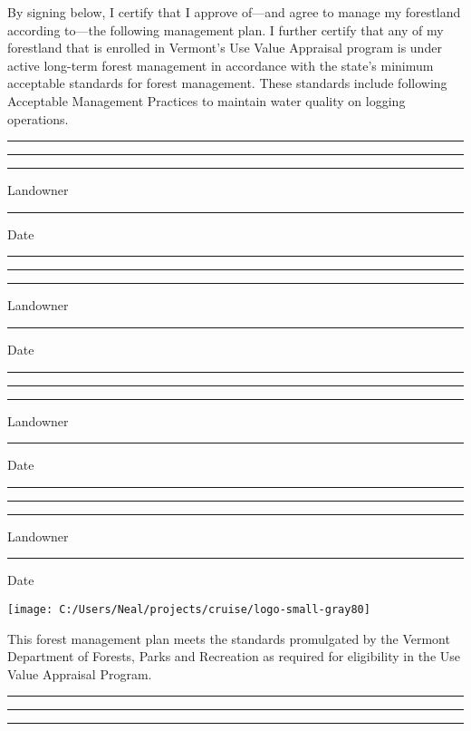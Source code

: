 \documentclass[]{tufte-handout}
\begin{document}
\vspace{20pt} By signing below, I certify that I approve of---and agree
to manage my forestland according to---the following management plan. I
further certify that any of my forestland that is enrolled in Vermont's
Use Value Appraisal program is under active long-term forest management
in accordance with the state's minimum acceptable standards for forest
management. These standards include following Acceptable Management
Practices to maintain water quality on logging operations.

\vspace{22pt}

\noindent\rule{7.3cm}{0.4pt} \rule{.3cm}{0pt} \rule{3cm}{0.4pt}

\noindent Landowner \rule{6cm}{0pt} Date

\vspace{18pt}

\noindent\rule{7.3cm}{0.4pt} \rule{.3cm}{0pt} \rule{3cm}{0.4pt}

\noindent Landowner \rule{6cm}{0pt} Date

\vspace{18pt}

\noindent\rule{7.3cm}{0.4pt} \rule{.3cm}{0pt} \rule{3cm}{0.4pt}

\noindent Landowner \rule{6cm}{0pt} Date

\vspace{18pt}

\noindent\rule{7.3cm}{0.4pt} \rule{.3cm}{0pt} \rule{3cm}{0.4pt}

\noindent Landowner \rule{6cm}{0pt} Date

\begin{marginfigure}

{\centering \texttt{[image: C:/Users/Neal/projects/cruise/logo-small-gray80]} 

}

\end{marginfigure}

\vspace{35pt}

This forest management plan meets the standards promulgated by the
Vermont Department of Forests, Parks and Recreation as required for
eligibility in the Use Value Appraisal Program.

\vspace{22pt}

\noindent\rule{7.3cm}{0.4pt} \rule{.3cm}{0pt} \rule{3cm}{0.4pt}
\end{document}
